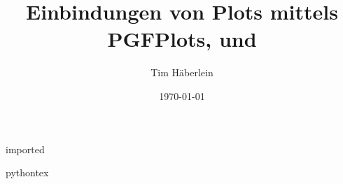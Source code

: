 \documentclass[ngerman, cd=true, cdfont=false, titlepage=true, cdtitle=true]{tudscrartcl}
\title{Einbindungen von Plots mittels PGFPlots, \matplotlib und \pythontex}
\author{Tim Häberlein}
\date{\today}
\institute{Institut für Autombiltechnik Dresden -- IAD}
\begin{document}
    \maketitle

    \tableofcontents
    \clearpage

    {imported}
    
    {pythontex}
\end{document}

